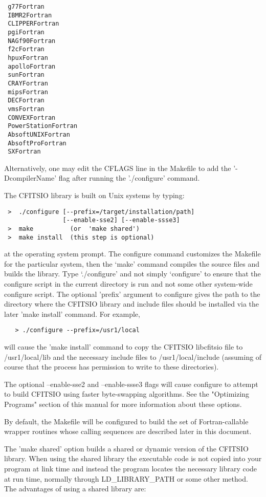 \documentclass[11pt]{book}
\begin{document}
\begin{verbatim}
 g77Fortran
 IBMR2Fortran
 CLIPPERFortran
 pgiFortran
 NAGf90Fortran
 f2cFortran
 hpuxFortran
 apolloFortran
 sunFortran
 CRAYFortran
 mipsFortran
 DECFortran
 vmsFortran
 CONVEXFortran
 PowerStationFortran
 AbsoftUNIXFortran
 AbsoftProFortran
 SXFortran
\end{verbatim}
Alternatively, one may edit the CFLAGS line in the Makefile to add the
'-DcompilerName' flag after running the './configure' command.

The CFITSIO library is built on Unix systems by typing:

\begin{verbatim}
 >  ./configure [--prefix=/target/installation/path]
                [--enable-sse2] [--enable-ssse3]
 >  make          (or  'make shared')
 >  make install  (this step is optional)
\end{verbatim}
at the operating system prompt.  The configure command customizes the
Makefile for the particular system, then the `make' command compiles the
source files and builds the library.  Type `./configure' and not simply
`configure' to ensure that the configure script in the current directory
is run and not some other system-wide configure script.  The optional
'prefix' argument to configure gives the path to the directory where
the CFITSIO library and include files should be installed via the later
'make install' command. For example,

\begin{verbatim}
   > ./configure --prefix=/usr1/local
\end{verbatim}
will cause the 'make install' command to copy the CFITSIO libcfitsio file
to /usr1/local/lib and the necessary include files to /usr1/local/include
(assuming of course that the  process has permission to write to these
directories).

The optional --enable-sse2 and --enable-ssse3 flags will cause configure to
attempt to build CFITSIO using faster byte-swapping algorithms.
See the "Optimizing Programs" section of this manual for
more information about these options.

By default, the Makefile will be configured to build the set of Fortran-callable
wrapper routines whose calling sequences are described later in this
document.

The 'make shared' option builds a shared or dynamic version of the
CFITSIO library.  When using the shared library the executable code is
not copied into your program at link time and instead the program
locates the necessary library code at run time, normally through
LD\_LIBRARY\_PATH or some other method. The advantages of using a shared
library are:
\end{document}
